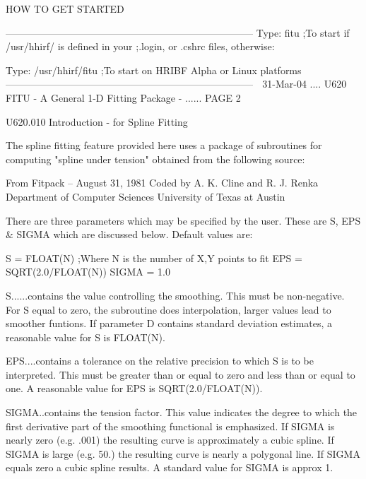                                HOW TO GET STARTED
 
   ---------------------------------------------------------------------------
   Type:  fitu               ;To start if /usr/hhirf/ is defined in your
                             ;.login, or .cshrc files, otherwise:
 
   Type:  /usr/hhirf/fitu    ;To start on HRIBF Alpha or Linux platforms
   ---------------------------------------------------------------------------
    
   31-Mar-04 .... U620  FITU - A General 1-D Fitting Package - ...... PAGE   2
 
 
   U620.010  Introduction - for Spline Fitting
 
   The  spline fitting feature provided here uses a package of subroutines for
   computing "spline under tension" obtained from the following source:
 
          From Fitpack -- August 31, 1981
          Coded by A. K. Cline and R. J. Renka
          Department of Computer Sciences
          University of Texas at Austin
 
   There are three parameters which may be specified by the  user.  These  are
   S, EPS & SIGMA which are discussed below. Default values are:
 
   S     =  FLOAT(N)            ;Where N is the number of X,Y points to fit
   EPS   =  SQRT(2.0/FLOAT(N))
   SIGMA =  1.0
 
   S......contains  the  value  controlling  the  smoothing.  This   must   be
          non-negative.  For  S   equal   to   zero,   the   subroutine   does
          interpolation,  larger  values  lead  to   smoother   funtions.   If
          parameter  D  contains  standard  deviation  estimates, a reasonable
          value for S is FLOAT(N).
 
   EPS....contains a tolerance on the relative precision to which S is  to  be
          interpreted.  This  must  be  greater than or equal to zero and less
          than   or   equal   to   one.   A   reasonable   value  for  EPS  is
          SQRT(2.0/FLOAT(N)).
 
   SIGMA..contains the tension factor. This  value  indicates  the  degree  to
          which  the  first  derivative  part  of  the smoothing functional is
          emphasized. If SIGMA is nearly zero (e.g. .001) the resulting  curve
          is  approximately  a  cubic spline. If SIGMA is large (e.g. 50.) the
          resulting curve is nearly a polygonal line. If SIGMA equals  zero  a
          cubic spline results. A standard value for SIGMA is approx 1.
 
